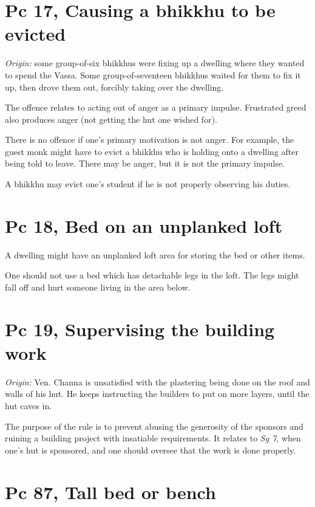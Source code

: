 \section{Pc 17, Causing a bhikkhu to be evicted}

\emph{Origin:} some group-of-six bhikkhus were fixing up a dwelling
where they wanted to spend the Vassa. Some group-of-seventeen bhikkhus
waited for them to fix it up, then drove them out, forcibly taking over
the dwelling.

The offence relates to acting out of anger as a primary impulse.
Frustrated greed also produces anger (not getting the hut one wished
for).

There is no offence if one's primary motivation is not anger. For
example, the guest monk might have to evict a bhikkhu who is holding
onto a dwelling after being told to leave. There may be anger, but it is
not the primary impulse.

A bhikkhu may evict one's student if he is not properly observing his
duties.

\section{Pc 18, Bed on an unplanked loft}

A dwelling might have an unplanked loft area for storing the bed or
other items.

One should not use a bed which has detachable legs in the loft. The legs
might fall off and hurt someone living in the area below.

\section{Pc 19, Supervising the building work}

\emph{Origin:} Ven. Channa is unsatisfied with the plastering being done
on the roof and walls of his hut. He keeps instructing the builders to
put on more layers, until the hut caves in.

The purpose of the rule is to prevent abusing the generosity of the
sponsors and ruining a building project with insatiable requirements. It
relates to \emph{Sg 7}, when one's hut is sponsored, and one should
oversee that the work is done properly.

\section{Pc 87, Tall bed or bench}

